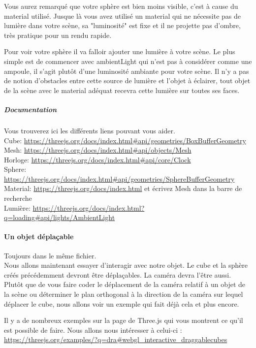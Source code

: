 \documentclass[a4paper,10pt]{article}
\begin{document}
Vous aurez remarqué que votre sphère est bien moins visible, c'est à cause du material utilisé.
Jusque là vous avez utilisé un material qui ne nécessite pas de lumière dans votre scène, sa "luminosité" est fixe et il ne projette pas d'ombre, très pratique pour un rendu rapide.

Pour voir votre sphère il va falloir ajouter une lumière à votre scène. Le plus simple est de commencer avec ambientLight qui n'est pas à considérer comme une ampoule, il s'agit plutôt d'une luminosité ambiante pour votre scène. Il n'y a pas de notion d'obstacles entre cette source de lumière et l'objet à éclairer, tout objet de la scène avec le material adéquat recevra cette lumière sur toutes ses faces.

\subparagraph{Documentation}
Vous trouverez ici les différents liens pouvant vous aider. \\
Cube: \url{https://threejs.org/docs/index.html#api/geometries/BoxBufferGeometry} \\
Mesh: \url{https://threejs.org/docs/index.html#api/objects/Mesh} \\
Horloge: \url{https://threejs.org/docs/index.html#api/core/Clock} \\
Sphere: \url{https://threejs.org/docs/index.html#api/geometries/SphereBufferGeometry} \\
Material: \url{https://threejs.org/docs/index.html} et écrivez Mesh dans la barre de recherche \\
Lumière: \url{https://threejs.org/docs/index.html?q=loading#api/lights/AmbientLight} \\

\paragraph{Un objet déplaçable}
Toujours dans le même fichier. \\
Nous allons maintenant essayer d'interagir avec notre objet.
Le cube et la sphère créés précédemment devront être déplaçables. La caméra devra l'être aussi.
Plutôt que de vous faire coder le déplacement de la caméra relatif à un objet de la scène ou déterminer le plan orthogonal à la direction de la caméra sur lequel déplacer le cube, nous allons voir un exemple qui fait déjà cela et plus encore.

Il y a de nombreux exemples sur la page de Three.js qui vous montrent ce qu'il est possible de faire.
Nous allons nous intéresser à celui-ci : \url{https://threejs.org/examples/?q=dra#webgl_interactive_draggablecubes}
\end{document}
